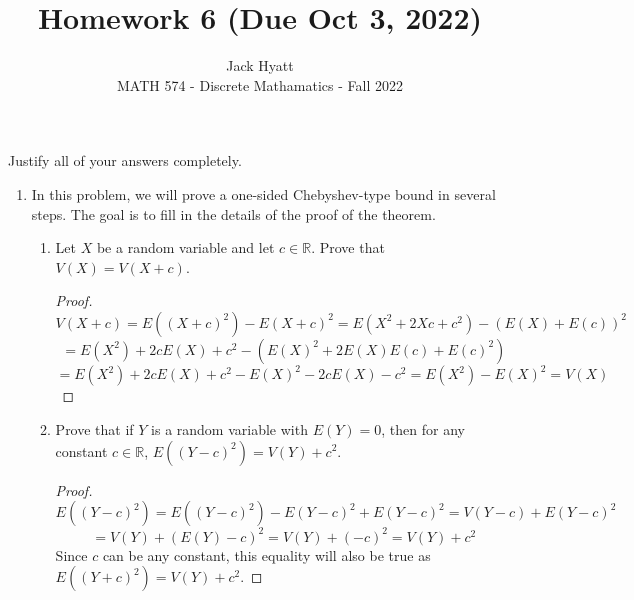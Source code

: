 \documentclass[12pt]{article}
\begin{document}
	
	
	
	\title{Homework 6 (Due Oct 3, 2022)}
	\author{Jack Hyatt\\ %
		MATH 574 - Discrete Mathamatics - Fall 2022} 
	
	\maketitle
	
	Justify all of your answers completely.\\

\renewcommand{\qedsymbol}{$\blacksquare$}

\begin{enumerate}
\item In this problem, we will prove a one-sided Chebyshev-type bound in several steps. The goal is to fill in the details of the proof of the theorem.

\begin{enumerate}

\item Let $X$ be a random variable and let $c \in \mathbb R$. Prove that $V(X) = V(X+c)$. \\
\begin{proof}
	\[V(X+c) = E((X+c)^2)-E(X+c)^2 = E(X^2+2Xc+c^2) - (E(X)+E(c))^2\]
	\[= E(X^2)+2cE(X)+c^2 - (E(X)^2+2E(X)E(c)+E(c)^2) \]
	\[= E(X^2)+2cE(X)+c^2 - E(X)^2-2cE(X)-c^2 = E(X^2) - E(X)^2 = V(X) \]
\end{proof}

\item Prove that if $Y$ is a random variable with $E(Y) = 0$, then for any constant $c \in \mathbb R$, $E((Y-c)^2) = V(Y) + c^2$. 

\begin{proof}
	\[E((Y-c)^2) = E((Y-c)^2) - E(Y-c)^2 + E(Y-c)^2 =  V(Y-c) + E(Y-c)^2\]
	\[ = V(Y) + (E(Y)-c)^2 = V(Y) + (-c)^2 = V(Y) +c^2\]
	Since $c$ can be any constant, this equality will also be true as $E((Y+c)^2)=V(Y)+c^2$.
\end{proof}


\end{enumerate}
\end{enumerate}
\end{document}
